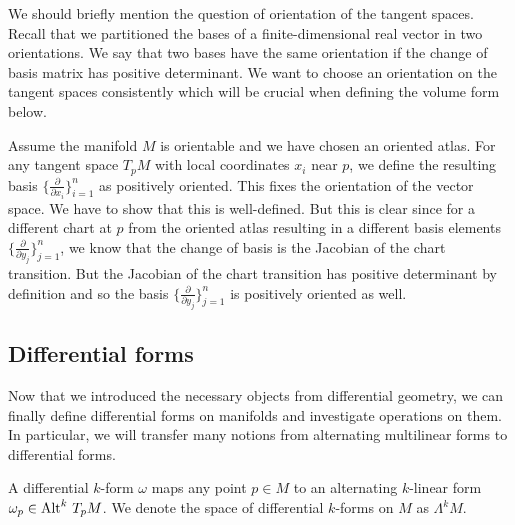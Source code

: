 \documentclass[../master_thesis.tex]{subfiles}
\begin{document}
We should briefly mention the question of orientation of the tangent spaces.
Recall that we partitioned the bases of a finite-dimensional real vector 
in two orientations. We say that two bases have the same 
orientation if the change of basis matrix has positive determinant.
We want to choose an orientation on the tangent spaces consistently which 
will be crucial when defining the volume form below.

Assume the manifold $M$ is orientable and we have chosen an oriented atlas.
For any tangent space $T_p M$ with local coordinates $x_i$ near $p$, 
we define the resulting basis $\{\frac{\partial}{\partial x_i}\}_{i=1}^n$ as positively
oriented. This fixes the orientation of the vector space. We have to show 
that this is well-defined. But this is clear since for a different 
chart at $p$ from the oriented atlas resulting in a different basis elements
$\{\frac{\partial}{\partial y_j}\}_{j=1}^n$,
we know that the change of 
basis is the Jacobian of the chart transition. But the Jacobian of the 
chart transition has positive determinant by definition and so the basis 
$\{\frac{\partial}{\partial y_j}\}_{j=1}^n$ is positively oriented as well.

\subsection{Differential forms}\label{sec:differential_forms_subsection}
Now that we introduced the necessary objects from differential geometry, 
we can finally define differential forms on manifolds and investigate operations 
on them. In particular, we will transfer many notions from alternating 
multilinear forms to differential forms.

\begin{definition}
    A differential $k$-form $\omega$ maps any point $p \in M$ to an 
    alternating $k$-linear form $\omega_p \in {\operatorname{Alt}^{k}\,T_p M}$.
    We denote the space of differential $k$-forms on $M$ as $\Lambda^k M$.
\end{definition}
\end{document}

